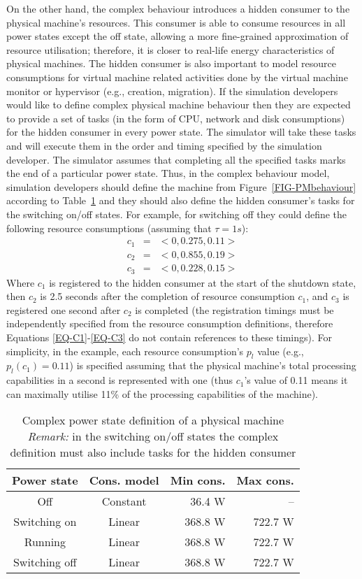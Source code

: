 \documentclass[sort, compress, 5p]{elsarticle}
\newcommand{\SMALLESTIMEGRANULARITYM}{\tau}
\begin{document}
On the other hand, the complex behaviour introduces a hidden consumer to the physical machine's resources. This consumer is able to consume resources in all power states except the off state, allowing a more fine-grained approximation of resource utilisation; therefore, it is closer to real-life energy characteristics of physical machines. The hidden consumer is also important to model resource consumptions for virtual machine related activities done by the virtual machine monitor or hypervisor (e.g., creation, migration). If the simulation developers would like to define complex physical machine behaviour then they are expected to provide a set of tasks (in the form of CPU, network and disk consumptions) for the hidden consumer in every power state. The simulator will take these tasks and will execute them in the order and timing specified by the simulation developer. The simulator assumes that completing all the specified tasks marks the end of a particular power state. Thus, in the complex behaviour model, simulation developers should define the machine from Figure~\ref{FIG-PMbehaviour} according to Table~\ref{TAB-COMPLEX} and they should also define the hidden consumer's tasks for the switching on/off states. For example, for switching off they could define the following resource consumptions (assuming that $\SMALLESTIMEGRANULARITYM=1s$):
\begin{eqnarray}
c_1&=&<0, 0.275, 0.11> \label{EQ-C1}\\
c_2&=&<0,0.855,0.19>\\
c_3&=&<0,0.228,0.15>\label{EQ-C3}
\end{eqnarray}
Where $c_1$ is registered to the hidden consumer at the start of the shutdown state, then $c_2$ is 2.5 seconds after the completion of resource consumption $c_1$, and $c_3$ is registered one second after $c_2$ is completed (the registration timings must be independently specified from the resource consumption definitions, therefore Equations \ref{EQ-C1}-\ref{EQ-C3} do not contain references to these timings). For simplicity, in the example, each resource consumption's $p_l$ value (e.g., $p_l(c_1)=0.11$) is specified assuming that the physical machine's total processing capabilities in a second is represented with one (thus $c_1$'s value of 0.11 means it can maximally utilise 11\% of the processing capabilities of the machine).

\begin{table}[tb]
\centering
\caption{Complex power state definition of a physical machine \\
{\footnotesize \emph{Remark:} in the switching on/off states the complex definition must also include tasks for the hidden consumer}
\label{TAB-COMPLEX}}
\begin{tabular}{ccrr}
Power state & Cons. model & Min cons. & Max cons. \\
\hline
Off & Constant & 36.4 W & -- \\
Switching on & Linear &368.8 W & 722.7 W\\
Running & Linear & 368.8 W & 722.7 W\\
Switching off & Linear & 368.8 W & 722.7 W\\
\hline
\end{tabular}
\end{table}
\end{document}
